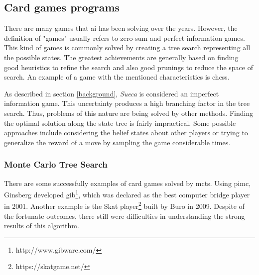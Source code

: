 \subsection{Card games programs}
 
 
There are many games that \gls{ai} has been solving over the years.
However, the definition of "games" usually refers to zero-sum and perfect information games.
This kind of games is commonly solved by creating a tree search representing all the possible states.
The greatest achievements are generally based on finding good heuristics to refine the search and also good prunings to reduce the space of search.
An example of a game with the mentioned characteristics is chess.


As described in section \ref{background}, \emph{Sueca} is considered an imperfect information game.
This uncertainty produces a high branching factor in the tree search.
Thus, problems of this nature are being solved by other methods.
Finding the optimal solution along the state tree is fairly impractical.
Some possible approaches include considering the belief states about other players or trying to generalize the reward of a move by sampling the game considerable times.



\subsubsection{Monte Carlo Tree Search}


There are some successfully examples of card games solved by \gls{mcts}.
Using \gls{pimc}, Ginsberg developed \gls{gib}\footnote{http://www.gibware.com/}, which was declared as the best computer bridge player in 2001.
Another example is the Skat player\footnote{https://skatgame.net/} built by Buro in 2009.
Despite of the fortunate outcomes, there still were difficulties in understanding the strong results of this algorithm.


